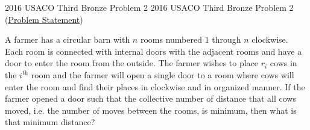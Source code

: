 \documentclass[../../../main.tex]{subfiles}
\begin{document}
\begin{problem}
{2016 USACO Third Bronze Problem 2}
{2016 USACO Third Bronze Problem 2}
(\href{https://usaco.org/index.php?page=viewproblem2&cpid=616}{Problem Statement})

A farmer has a circular barn with $n$ rooms numbered $1$ through
$n$ clockwise. Each room is connected with internal doors with the
adjacent rooms and have a door to enter the room from the outside.
The farmer wishes to place $r_i$ cows in the $i^\text{th}$ room
and the farmer will open a single door to a room where cows will
enter the room and find their places in clockwise and in organized
manner. If the farmer opened a door such that the collective number of
distance that all cows moved, i.e. the number of moves between the
rooms, is minimum, then what is that minimum distance?
\end{problem}
\end{document}
